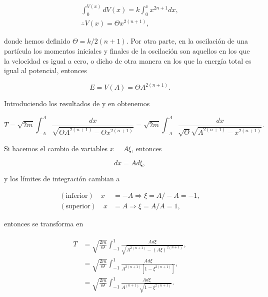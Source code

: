 \documentclass[a4paper,10pt]{article}
\numberwithin{equation}{section}
\begin{document}
\begin{gather}
 \int_{0}^{V(x)} dV(x) = k \int_0^x x^{2n+1} dx, \\
 \therefore V(x) = \Theta x^{2(n+1)},
 \label{eq:potencial2}
\end{gather}

donde hemos definido $\Theta = k/2(n+1)$. Por otra parte, en la oscilación de una partícula
los momentos iniciales y finales de la oscilación son aquellos en los que la velocidad es 
igual a cero, o dicho de otra manera en los que la energía total es igual al potencial,
entonces

\begin{equation}
 E = V(A) =  \Theta A^{2(n+1)}.
 \label{eq:energTotal2}
\end{equation}

Introduciendo los resultados de  y  en 
 obtenemos

\begin{equation}
 T = \sqrt{2m} \int_{-A}^A \frac{dx}{\sqrt{\Theta A^{2(n+1)} - \Theta x^{2(n+1)}}} = 
 \sqrt{2m} \int_{-A}^A \frac{dx}{\sqrt{\Theta} \sqrt{A^{2(n+1)} - x^{2(n+1)}}}.
 \label{eq:periodo2}
\end{equation}

Si hacemos el cambio de variables $x = A \xi$, entonces 

\begin{equation}
 dx = A d\xi,
\end{equation}

y los límites de integración cambian a 

\begin{align*}
%
 (\text{inferior}) \quad x &= - A \Rightarrow \xi = A / -A = -1, \\
 (\text{superior}) \quad x &= A \Rightarrow \xi = A / A = 1,
\end{align*}

entonces  se transforma en 

\begin{align}
 \begin{split}
  T &= \sqrt{\frac{2m}{\Theta}} \int_{-1}^1 \frac{A d\xi}{\sqrt{A^{2(n+1)} - (A\xi)^{2(n+1)}}}, \\
    &= \sqrt{\frac{2m}{\Theta}} \int_{-1}^1 \frac{Ad\xi}{A^{2(n+1)}[1 - \xi^{2(n+1)}]}, \\
    &= \sqrt{\frac{2m}{\Theta}} \int_{-1}^1 \frac{Ad\xi}{A^{(n+1)}\sqrt{1-\xi^{2(n+1)}}}.
 \end{split}
\end{align}
\end{document}

